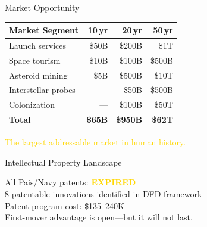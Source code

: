 \documentclass[aspectratio=169,10pt]{beamer}
\begin{document}
\begin{frame}[t]{Market Opportunity}
\vspace{0.3cm}
\begin{center}
\footnotesize
\begin{tabular}{l r r r}
  \toprule
  \textbf{Market Segment} & \textbf{10\,yr} & \textbf{20\,yr}
    & \textbf{50\,yr} \\
  \midrule
  Launch services     & \$50B  & \$200B  & \$1T \\
  Space tourism       & \$10B  & \$100B  & \$500B \\
  Asteroid mining     & \$5B   & \$500B  & \$10T \\
  Interstellar probes & ---    & \$50B   & \$500B \\
  Colonization        & ---    & \$100B  & \$50T \\
  \midrule
  \textbf{Total}      & \textbf{\$65B} & \textbf{\$950B}
    & \textbf{\$62T} \\
  \bottomrule
\end{tabular}
\end{center}
\vspace{0.2cm}
\begin{center}
  \small\textcolor{gold}{The largest addressable market
    in human history.}
\end{center}
\end{frame}

\begin{frame}[t]{Intellectual Property Landscape}
\vspace{0.6cm}
\begin{center}
  {\large All Pais/Navy patents:
    \textcolor{gold}{\textbf{EXPIRED}}}\\[16pt]
  {\normalsize 8 patentable innovations identified
    in DFD framework}\\[12pt]
  {\normalsize Patent program cost:
    \textcolor{electricblue}{\$135--240K}}\\[16pt]
  \small\textcolor{white!70}{First-mover advantage is
    open---but it will not last.}
\end{center}
\end{frame}
\end{document}
